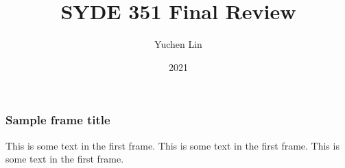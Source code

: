 \documentclass{beamer}
\title{SYDE 351 Final Review}
\author{Yuchen Lin}
\institute{Overleaf}
\date{2021}
\begin{document}
\frame{\titlepage}

\begin{frame}
\frametitle{Sample frame title}
This is some text in the first frame. This is some text in the first frame. This is some text in the first frame.
\end{frame}
\end{document}
